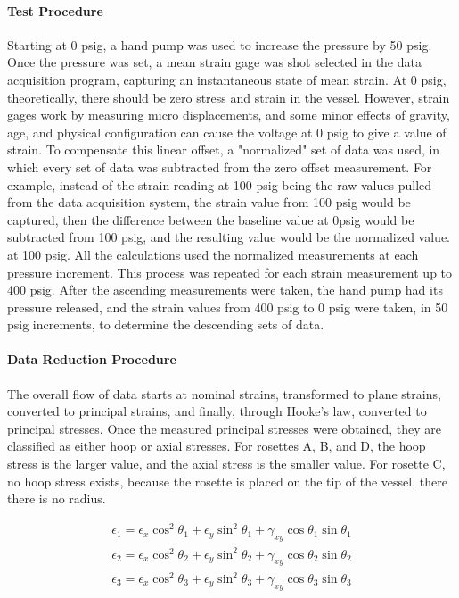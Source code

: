 \documentclass{article}
\begin{document}
\paragraph{Test Procedure}
Starting at 0 psig, a hand pump was used to increase the pressure by 50 psig. Once the pressure was set, a mean strain gage was shot selected in the data acquisition program, capturing an instantaneous 
state of mean strain. At 0 psig, theoretically, there should
be zero stress and strain in the vessel. However, strain gages work by measuring micro displacements, and some
minor effects of gravity, age, and physical configuration can cause the voltage at 0 psig to give a value of strain. To
compensate this linear offset, a "normalized" set of data was used, in which every set of data was subtracted from the
zero offset measurement. For example, instead of the strain reading at 100 psig being the raw values pulled from
the data acquisition system, the strain value from 100 psig would be captured, then the difference between the 
baseline value at 0psig would be subtracted from 100 psig, and the resulting value would be the normalized value.  
at 100 psig. All the calculations used the normalized measurements at each pressure increment. This process
was repeated for each strain measurement up to 400 psig. After the ascending measurements were taken, the 
hand pump had its pressure released, and the strain values from 400 psig to 0 psig were taken, in 50 psig 
increments, to determine the descending sets of data. 


\paragraph {Data Reduction Procedure }
The overall flow of data starts at nominal strains, transformed to plane strains, converted  to
principal strains, and finally, through Hooke's law, converted to principal stresses. Once the measured 
principal stresses were obtained, they are  classified as either hoop or axial stresses. For rosettes A, B, and D,
the hoop stress is the larger value, and the axial stress is the smaller value. For rosette C, no hoop stress exists,
because the rosette is placed on the tip of the vessel, there there is no radius. 

\begin{align}
\epsilon_1 = \epsilon_x\cos^{2}\theta_1 + \epsilon_y\sin^{2}\theta_1 + \gamma_{xy}\cos{\theta_1}\sin{\theta_1} \\
\epsilon_2 = \epsilon_x\cos^{2}\theta_2 + \epsilon_y\sin^{2}\theta_2 + \gamma_{xy}\cos{\theta_2}\sin{\theta_2} \\
\epsilon_3 = \epsilon_x\cos^{2}\theta_3 + \epsilon_y\sin^{2}\theta_3 + \gamma_{xy}\cos{\theta_3}\sin{\theta_3} 
\end{align}
\end{document}
